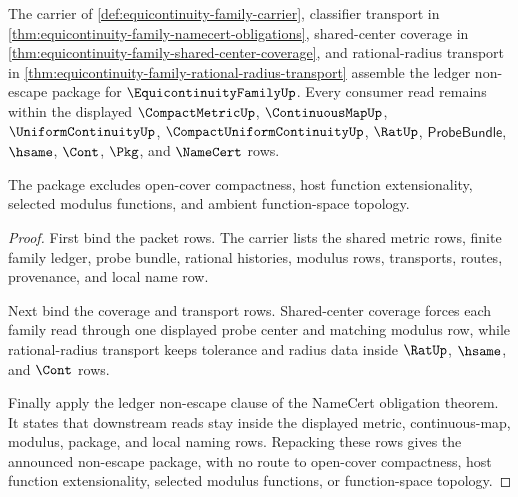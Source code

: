 \begin{theorem}
\label{thm:equicontinuity-family-ledger-non-escape-package}
The carrier of \autoref{def:equicontinuity-family-carrier}, classifier transport in \autoref{thm:equicontinuity-family-namecert-obligations}, shared-center coverage in \autoref{thm:equicontinuity-family-shared-center-coverage}, and rational-radius transport in \autoref{thm:equicontinuity-family-rational-radius-transport} assemble the ledger non-escape package for $\EquicontinuityFamilyUp$. Every consumer read remains within the displayed $\CompactMetricUp$, $\ContinuousMapUp$, $\UniformContinuityUp$, $\CompactUniformContinuityUp$, $\RatUp$, $\mathsf{ProbeBundle}$, $\hsame$, $\Cont$, $\Pkg$, and $\NameCert$ rows.

The package excludes open-cover compactness, host function extensionality, selected modulus functions, and ambient function-space topology.
\end{theorem}
\begin{proof}
First bind the packet rows. The carrier lists the shared metric rows, finite family ledger, probe bundle, rational histories, modulus rows, transports, routes, provenance, and local name row.

Next bind the coverage and transport rows. Shared-center coverage forces each family read through one displayed probe center and matching modulus row, while rational-radius transport keeps tolerance and radius data inside $\RatUp$, $\hsame$, and $\Cont$ rows.

Finally apply the ledger non-escape clause of the NameCert obligation theorem. It states that downstream reads stay inside the displayed metric, continuous-map, modulus, package, and local naming rows. Repacking these rows gives the announced non-escape package, with no route to open-cover compactness, host function extensionality, selected modulus functions, or function-space topology.
\end{proof}

